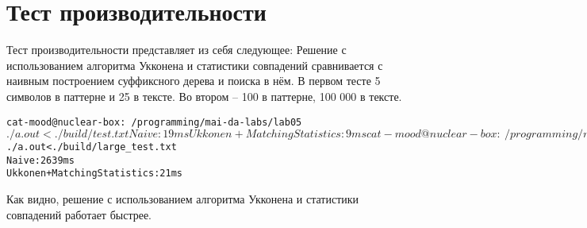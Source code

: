 \section{Тест производительности}

Тест производительности представляет из себя следующее: 
Решение с использованием алгоритма Укконена и статистики совпадений сравнивается с наивным построением
суффиксного дерева и поиска в нём.
В первом тесте 5 символов в паттерне и 25 в тексте. Во втором -- 100 в паттерне,
100 000 в тексте.

\begin{alltt}
    cat-mood@nuclear-box:~/programming/mai-da-labs/lab05$ ./a.out < ./build/test.txt
    Naive: 19 ms
    Ukkonen + Matching Statistics: 9 ms

    cat-mood@nuclear-box:~/programming/mai-da-labs/lab05$ ./a.out < ./build/large_test.txt
    Naive: 2639 ms
    Ukkonen + Matching Statistics: 21 ms
\end{alltt}

Как видно, решение с использованием алгоритма Укконена и статистики совпадений работает быстрее.
\pagebreak
